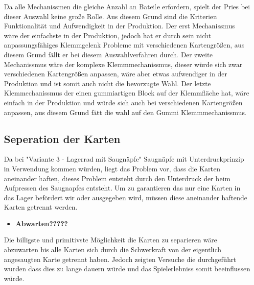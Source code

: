 Da alle Mechanissmen die gleiche Anzahl an Bateile erfordern, spielt der Pries bei dieser Auswahl keine große Rolle. Aus diesem Grund
sind die Kriterien Funktionalität und Aufwendigkeit in der Produktion. Der erst Mechanissmus wäre der einfachste in der Produktion, jedoch
hat er durch sein nicht anpassungsfähiges Klemmgelenk Probleme mit verschiedenen Kartengrößen, aus diesem Grund fällt er bei diesem Auswahlverfahren durch.
Der zweite Mechanissmus wäre der komplexe Klemmmechanissmus, dieser würde sich zwar verschiedenen Kartengrößen anpassen, wäre aber etwas aufwendiger in der
Produktion und ist somit auch nicht die bevorzugte Wahl. Der letzte Klemmechanissmus der einen gummiartigen Block auf der Klemmfläche hat, wäre einfach in der
Produktion und würde sich auch bei verschiedenen Kartengrößen anpassen, aus diesem Grund  fätt die wahl auf den Gummi Klemmmechanissmus.

\subsection{Seperation der Karten}
Da bei "Variante 3 - Lagerrad mit Saugnäpfe" Saugnäpfe mit Unterdruckprinzip in Verwendung kommen würden, liegt das Problem vor,
dass die Karten aneinander haften, dieses Problem entsteht durch den Unterdruck der beim Aufpressen des Saugnapfes entsteht.
Um zu garantieren das nur eine Karten in das Lager befördert wir oder ausgegeben wird, müssen diese aneinander
haftende Karten getrennt werden.

\begin{itemize}
    \item \textbf{Abwarten?????}
\end{itemize}

Die billigste und primitivste Möglichkeit die Karten zu separieren wäre abzuwarten bis alle Karten sich durch die Schwerkraft
von der eigentlich angesaugten Karte getrennt haben. Jedoch zeigten Versuche die durchgeführt wurden dass dies zu lange
dauern würde und das Spielerlebniss somit beeinflussen würde.

